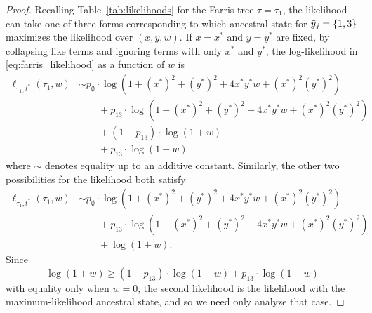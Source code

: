\begin{proof}
Recalling Table~\ref{tab:likelihoods} for the Farris tree $\tau = \tau_1$, the likelihood can take one of three forms corresponding to which ancestral state for $\tilde{y}_j=\{1,3\}$ maximizes the likelihood over $(x,y,w)$.
If $x=x^*$ and $y=y^*$ are fixed, by collapsing like terms and ignoring terms with only $x^*$ and $y^*$, the log-likelihood in \eqref{eq:farris_likelihood} as a function of $w$ is
\begin{align*}
    \ell_{\tau_1,t^*}(\tau_1, w)
    &\sim     p_{\emptyset}  \cdot\log(1+(x^*)^2+(y^*)^2+4x^*y^*w+(x^*)^2(y^*)^2) \\
    &\qquad + p_{13}         \cdot\log(1+(x^*)^2+(y^*)^2-4x^*y^*w+(x^*)^2(y^*)^2) \\
    &\qquad + (1 - p_{13})\cdot\log(1+w) \\
    &\qquad + p_{13}\cdot\log(1-w)
\end{align*}
where $\sim$ denotes equality up to an additive constant.
Similarly, the other two possibilities for the likelihood both satisfy
\begin{align*}
    \ell_{\tau_1,t^*}(\tau_1, w)
    &\sim     p_{\emptyset}  \cdot\log(1+(x^*)^2+(y^*)^2+4x^*y^*w+(x^*)^2(y^*)^2) \\
    &\qquad + p_{13}         \cdot\log(1+(x^*)^2+(y^*)^2-4x^*y^*w+(x^*)^2(y^*)^2) \\
    &\qquad + \log(1+w).
\end{align*}
Since
$$
\log(1+w) \geq (1 - p_{13})\cdot\log(1+w) + p_{13}\cdot\log(1-w)
$$
with equality only when $w=0$, the second likelihood is the likelihood with the maximum-likelihood ancestral state, and so we need only analyze that case.


\end{proof}
